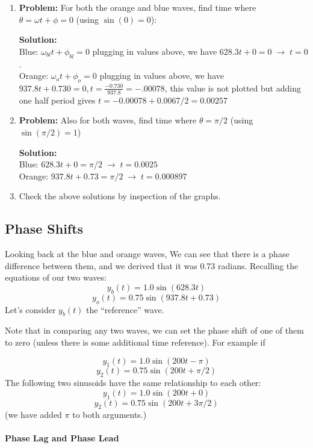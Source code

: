 \begin{enumerate}


\item  {\bf Problem:}
For both the orange and blue waves, find time where $\theta = \omega t+\phi =  0$ (using $\sin(0) = 0$):

{\bf Solution:}\\
    Blue: $\omega_{bl} t + \phi_{bl} = 0$ plugging in values above, we have $628.3t+0=0 \; \to\; t = 0$.\\
    Orange: $\omega_o t + \phi_o = 0$ plugging in values above, we have $937.8t+0.730=0, t = \frac{-0.730}{937.8}=-.00078$,  this value is not plotted but adding one half period gives $t=-0.00078+0.0067/2 =0.00257$


\item {\bf Problem:} Also for both waves, find time where $\theta = \pi/2$ (using $\sin(\pi/2)=1$)

  {\bf Solution:}\\
    Blue: $628.3t+0=\pi/2\;\to\;t = 0.0025$\\
    Orange: $937.8t+0.73 = \pi/2\;\to\;t=0.000897$

\item Check the above solutions by inspection of the graphs.
\end{enumerate}




\subsection{Phase Shifts }  Looking back at the blue and orange waves, We can see that there is a
phase difference between them, and we derived that it was 0.73 radians.
Recalling the equations of our two waves:
\[
y_b(t) = 1.0\sin(628.3t)
\]
\[
y_o(t) = 0.75\sin(937.8t+ 0.73)
\]
Let's consider $y_b(t)$ the ``reference'' wave.

Note that in comparing any two waves, we can set the
phase shift of one of them to zero (unless there is some additional time reference).  For example
if

\[
y_1(t) = 1.0\sin(200t - \pi)
\]
\[
y_2(t) = 0.75\sin(200t +\pi/2)
\]
The following two sinusoids have the same relationship to each other:
\[
y_1(t) = 1.0\sin(200t + 0)
\]
\[
y_2(t) = 0.75\sin(200t + 3\pi/2)
\]
(we have added $\pi$ to both arguments.)

\paragraph{Phase Lag and Phase Lead}

